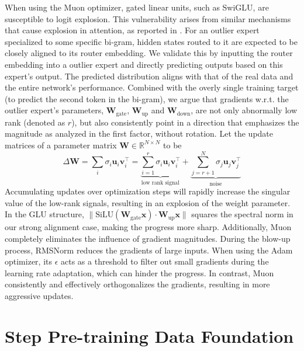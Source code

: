 When using the Muon optimizer, gated linear units, such as SwiGLU, are susceptible to logit explosion. This vulnerability arises from similar mechanisms that cause explosion in attention, as reported in \cite{kimi_k2}.
For an outlier expert specialized to some specific bi-gram, hidden states routed to it are expected to be closely aligned to its router embedding. We validate this by inputting the router embedding into a outlier expert and directly predicting outputs based on this expert's output. The predicted distribution aligns with that of the real data and the entire network's performance. Combined with the overly single training target (to predict the second token in the bi-gram), we argue that gradients w.r.t. the outlier expert's parameters, $\boldsymbol{W}_{\text{gate}}$, $\boldsymbol{W}_{\text{up}}$ and $\boldsymbol{W}_{\text{down}}$, are not only abnormally low rank (denoted as $r$), but also consistently point in a direction that emphasizes the magnitude as analyzed in the first factor, without rotation. Let the update matrices of a parameter matrix $\boldsymbol{W}\in\mathbb{R}^{N\times N}$ to be
\begin{equation}
\Delta \boldsymbol{W} = \sum_i \sigma_i \boldsymbol{u}_i\boldsymbol{v}_i^\top =  \underbrace{\sum_{i=1}^r \sigma_i \boldsymbol{u}_i\boldsymbol{v}_i^\top}_{\text{low rank signal}} + \underbrace{\sum_{j=r+1}^{N} \sigma_j \boldsymbol{u}_j\boldsymbol{v}_j^\top}_{\text{noise}}
\end{equation}
Accumulating updates over optimization steps will rapidly increase the singular value of the low-rank signals, resulting in an explosion of the weight parameter. In the GLU structure, $\|\text{SiLU}(\boldsymbol{W}_{\text{gate}}\boldsymbol{x})\cdot\boldsymbol{W}_{\text{up}}\boldsymbol{x}\|$ squares the spectral norm in our strong alignment case, making the progress more sharp. Additionally, Muon completely eliminates the influence of gradient magnitudes. During the blow-up process, RMSNorm reduces the gradients of large inputs. When using the Adam optimizer, its $\epsilon$ acts as a threshold to filter out small gradients during the learning rate adaptation, which can hinder the progress. In contrast, Muon consistently and effectively orthogonalizes the gradients, resulting in more aggressive updates.


\section{Step Pre-training Data Foundation}
\label{sec:step-data}

